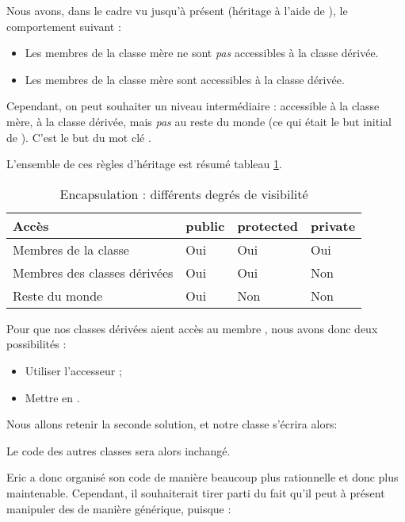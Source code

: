 Nous avons, dans le cadre vu jusqu'\`a pr\'esent (h\'eritage \`a l'aide de ), le comportement suivant :

\begin{itemize}
	\item Les membres  de la classe m\`ere ne sont \emph{pas} accessibles \`a la classe d\'eriv\'ee.
	\item Les membres  de la classe m\`ere sont accessibles \`a la classe d\'eriv\'ee.	
\end{itemize}

Cependant, on peut souhaiter un niveau interm\'ediaire : accessible \`a la classe m\`ere, \`a la classe d\'eriv\'ee, mais \emph{pas} au reste du monde (ce qui \'etait le but initial de ). C'est le but du mot cl\'e .

L'ensemble de ces r\`egles d'h\'eritage est r\'esum\'e tableau \ref{tab:encapsulationvisibilite}.

\begin{table}
	\centering
	\begin{tabular}{l|l|l|l}
	Acc\`es	& public & protected & private\\
	\hline
	Membres de la classe & Oui & Oui & Oui \\
	\hline
	Membres des classes d\'eriv\'ees & Oui & Oui & Non\\
	\hline
	Reste du monde & Oui & Non & Non\\
	\hline
	\end{tabular}
	\caption{Encapsulation : diff\'erents degr\'es de visibilit\'e}
	\label{tab:encapsulationvisibilite}
\end{table}

Pour que nos classes d\'eriv\'ees aient acc\`es au membre , nous avons donc deux possibilit\'es :

\begin{itemize}
	\item  Utiliser l'accesseur ;
	\item  Mettre  en .
\end{itemize}

Nous allons retenir la seconde solution, et notre classe  s'\'ecrira alors:


Le code des autres classes sera alors inchang\'e.


Eric a donc organis\'e son code de mani\`ere beaucoup plus rationnelle et donc
plus maintenable. Cependant, il souhaiterait tirer parti du fait
qu'il peut \`a pr\'esent manipuler des  de mani\`ere
g\'en\'erique, puisque :

